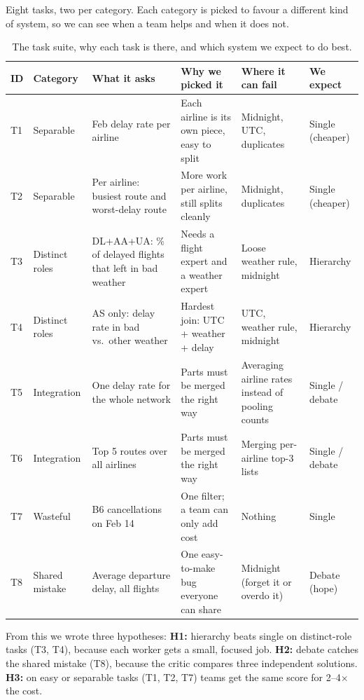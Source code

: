 \documentclass[10pt]{article}
\begin{document}
Eight tasks, two per category. Each category is picked to favour a different kind of system, so we can see
when a team helps and when it does not.

\begin{table}[H]
\centering\small
\begin{tabularx}{\linewidth}{l l Y Y Y l}
\toprule
ID & Category & What it asks & Why we picked it & Where it can fail & We expect \\
\midrule
T1 & Separable & Feb delay rate per airline & Each airline is its own piece, easy to split & Midnight, UTC, duplicates & Single (cheaper) \\
T2 & Separable & Per airline: busiest route and worst-delay route & More work per airline, still splits cleanly & Midnight, duplicates & Single (cheaper) \\
T3 & Distinct roles & DL+AA+UA: \% of delayed flights that left in bad weather & Needs a flight expert and a weather expert & Loose weather rule, midnight & Hierarchy \\
T4 & Distinct roles & AS only: delay rate in bad vs.\ other weather & Hardest join: UTC + weather + delay & UTC, weather rule, midnight & Hierarchy \\
T5 & Integration & One delay rate for the whole network & Parts must be merged the right way & Averaging airline rates instead of pooling counts & Single / debate \\
T6 & Integration & Top 5 routes over all airlines & Parts must be merged the right way & Merging per-airline top-3 lists & Single / debate \\
T7 & Wasteful & B6 cancellations on Feb 14 & One filter; a team can only add cost & Nothing & Single \\
T8 & Shared mistake & Average departure delay, all flights & One easy-to-make bug everyone can share & Midnight (forget it or overdo it) & Debate (hope) \\
\bottomrule
\end{tabularx}
\caption{The task suite, why each task is there, and which system we expect to do best.}
\end{table}

From this we wrote three hypotheses:
\textbf{H1:} hierarchy beats single on distinct-role tasks (T3, T4), because each worker gets a small, focused job.
\textbf{H2:} debate catches the shared mistake (T8), because the critic compares three independent solutions.
\textbf{H3:} on easy or separable tasks (T1, T2, T7) teams get the same score for 2--4$\times$ the cost.
\end{document}
